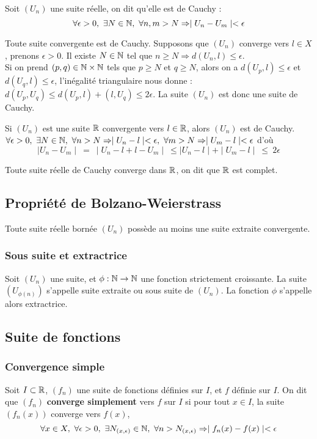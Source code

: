 Soit $(U_n)$ une suite réelle, on dit qu'elle est de Cauchy \ssi : 
$$\forall \epsilon > 0, ~ \exists N \in \mathbb{N}, ~ \forall n,m > N \Rightarrow \mid U_n - U_m \mid < \epsilon$$
\ed

\bp
Toute suite convergente est de Cauchy.
\ep
\bpf
Supposons que $(U_n)$ converge vers $l\in X$, prenons $\epsilon > 0$. Il existe $N \in \mathbb{N}$ tel que $n\geq N \Rightarrow d(U_n, l) \leq \epsilon$.\\
Si on prend $(p,q) \in \mathbb{N} \times \mathbb{N}$ tels que $p \geq N$ et $q \geq N$, alors on a $d(U_p,l) \leq \epsilon$ et $d(U_q,l) \leq \epsilon$, l'inégalité triangulaire nous donne : $d(U_p,U_q) \leq d(U_p,l) + (l,U_q) \leq 2\epsilon$. La suite $(U_n)$ est donc une suite de Cauchy.
\epf

Si $(U_n)$ est une suite $\mathbb{R}$ convergente vers $l\in \mathbb{R}$, alors $(U_n)$ est de Cauchy.
\ep
\bpf
$\forall \epsilon > 0, ~ \exists N \in \mathbb{N}, ~ \forall n > N \Rightarrow \mid U_n - l \mid < \epsilon, ~ \forall m > N \Rightarrow \mid U_m - l \mid < \epsilon$ d'où $$\mid U_n - U_m \mid ~ = ~ \mid U_n -l +l - U_m \mid ~ \leq \mid U_n -l \mid + \mid U_m - l \mid ~ \leq ~ 2 \epsilon$$
\epf

Toute suite réelle de Cauchy converge dans $\mathbb{R}$, on dit que $\mathbb{R}$ est complet.
\ep

\subsection{Propriété de Bolzano-Weierstrass}
\bp
Toute suite réelle bornée $(U_n)$ possède au moins une suite extraite convergente.
\ep
\subsubsection{Sous suite et extractrice}
\bd[Extractrice]
Soit $(U_n)$ une suite, et $\phi : \mathbb{N} \to \mathbb{N}$ une fonction strictement croissante. La suite $(U_{\phi(n)})$ s'appelle suite extraite ou sous suite de $(U_n)$. La fonction $\phi$ s'appelle alors extractrice.
\ed

\subsection{Suite de fonctions}
\subsubsection{Convergence simple}
\bd[CVS]
Soit $I \subset \mathbb{R}$, $(f_n)$ une suite de fonctions définies sur $I$, et $f$ définie sur $I$. On dit que $(f_n)$ \textbf{converge simplement} vers $f$ sur $I$ si pour tout $x \in I$, la suite $(f_n(x))$ converge vers $f(x)$, \ie $$\forall x \in X, ~ \forall \epsilon > 0, ~ \exists N_{(x,\epsilon)} \in \mathbb{N}, ~ \forall n > N_{(x,\epsilon)} \Rightarrow \mid f_n(x) - f(x)\mid < \epsilon$$
\ed

